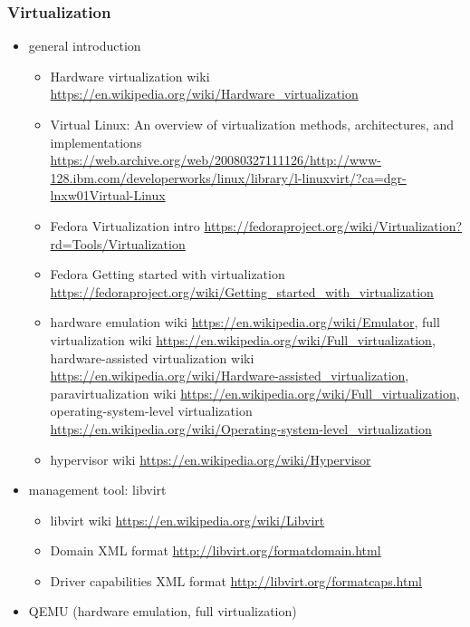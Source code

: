 \documentclass{article}
\begin{document}
\subsubsection{Virtualization}
%
\begin{itemize}
    \item general introduction
        \begin{itemize}
            \item Hardware virtualization wiki \url{https://en.wikipedia.org/wiki/Hardware_virtualization}
            \item Virtual Linux: An overview of virtualization methods, architectures, and implementations \url{https://web.archive.org/web/20080327111126/http://www-128.ibm.com/developerworks/linux/library/l-linuxvirt/?ca=dgr-lnxw01Virtual-Linux}
            \item Fedora Virtualization intro \url{https://fedoraproject.org/wiki/Virtualization?rd=Tools/Virtualization}
            \item Fedora Getting started with virtualization \url{https://fedoraproject.org/wiki/Getting_started_with_virtualization}
            \item hardware emulation wiki \url{https://en.wikipedia.org/wiki/Emulator},
                  full virtualization wiki \url{https://en.wikipedia.org/wiki/Full_virtualization},
                  hardware-assisted virtualization wiki \url{https://en.wikipedia.org/wiki/Hardware-assisted_virtualization},
                  paravirtualization wiki \url{https://en.wikipedia.org/wiki/Full_virtualization},
                  operating-system-level virtualization \url{https://en.wikipedia.org/wiki/Operating-system-level_virtualization}
            \item hypervisor wiki \url{https://en.wikipedia.org/wiki/Hypervisor}
        \end{itemize}
    \item management tool: libvirt
        \begin{itemize}
            \item libvirt wiki \url{https://en.wikipedia.org/wiki/Libvirt}
            \item Domain XML format \url{http://libvirt.org/formatdomain.html}
            \item Driver capabilities XML format \url{http://libvirt.org/formatcaps.html}
        \end{itemize}
    \item QEMU (hardware emulation, full virtualization)
        \begin{itemize}

\end{itemize}
\end{itemize}
\end{document}
